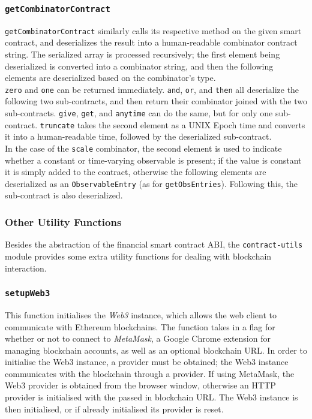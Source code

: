 \subsubsection{\texttt{getCombinatorContract}}

\texttt{getCombinatorContract} similarly calls its respective method on the given smart contract, and deserializes the result into a human-readable combinator contract string. The serialized array is processed recursively; the first element being deserialized is converted into a combinator string, and then the following elements are deserialized based on the combinator's type. \\

\texttt{zero} and \texttt{one} can be returned immediately. \texttt{and}, \texttt{or}, and \texttt{then} all deserialize the following two sub-contracts, and then return their combinator joined with the two sub-contracts. \texttt{give}, \texttt{get}, and \texttt{anytime} can do the same, but for only one sub-contract. \texttt{truncate} takes the second element as a UNIX Epoch time and converts it into a human-readable time, followed by the deserialized sub-contract. \\

In the case of the \texttt{scale} combinator, the second element is used to indicate whether a constant or time-varying observable is present; if the value is constant it is simply added to the contract, otherwise the following elements are deserialized as an \texttt{ObservableEntry} (as for \texttt{getObsEntries}). Following this, the sub-contract is also deserialized.


\subsubsection{Other Utility Functions} \label{contract-util-functions}

Besides the abstraction of the financial smart contract ABI, the \texttt{contract-utils} module provides some extra utility functions for dealing with blockchain interaction.

\subsubsection{\texttt{setupWeb3}}

This function initialises the \textit{Web3} instance, which allows the web client to communicate with Ethereum blockchains. The function takes in a flag for whether or not to connect to \textit{MetaMask}, a Google Chrome extension for managing blockchain accounts, as well as an optional blockchain URL. In order to initialise the Web3 instance, a provider must be obtained; the Web3 instance communicates with the blockchain through a provider. If using MetaMask, the Web3 provider is obtained from the browser window, otherwise an HTTP provider is initialised with the passed in blockchain URL. The Web3 instance is then initialised, or if already initialised its provider is reset.


